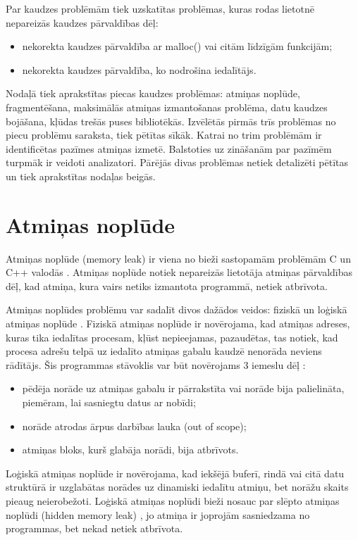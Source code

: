 ﻿ \label{sec:problems}
Par kaudzes problēmām tiek uzskatītas problēmas, kuras rodas lietotnē nepareizās kaudzes pārvaldības dēļ: 
\begin{itemize}
\item nekorekta kaudzes pārvaldība ar malloc() vai citām līdzīgām funkcijām;
\item nekorekta kaudzes pārvaldība, ko nodrošina iedalītājs.
\end{itemize}

Nodaļā tiek aprakstītas piecas kaudzes problēmas: atmiņas noplūde, fragmentēšana, maksimālās atmiņas izmantošanas problēma, datu kaudzes bojāšana, kļūdas trešās puses bibliotēkās.
Izvēlētās pirmās trīs problēmas no piecu problēmu saraksta, tiek pētītas sīkāk. 
Katrai no trim problēmām ir identificētas pazīmes atmiņas izmetē.
Balstoties uz zināšanām par pazīmēm turpmāk ir veidoti analizatori.
Pārējās divas problēmas netiek detalizēti pētītas un tiek aprakstītas nodaļas beigās.

\section{Atmiņas noplūde}

Atmiņas noplūde (memory leak) ir viena no bieži sastopamām problēmām C un C++ valodās \cite{GNED}.
Atmiņas noplūde notiek nepareizās lietotāja atmiņas pārvaldības dēļ, kad atmiņa, kura vairs netiks izmantota programmā, netiek atbrīvota.

Atmiņas noplūdes problēmu var sadalīt divos dažādos veidos: fiziskā un loģiskā atmiņas noplūde \cite{JMMR}.
Fiziskā atmiņas noplūde ir novērojama, kad atmiņas adreses, kuras tika iedalītas procesam,  kļūst nepieejamas, pazaudētas, tas notiek, kad procesa adrešu telpā uz iedalīto atmiņas gabalu kaudzē nenorāda neviens rādītājs.
Šis programmas stāvoklis var būt novērojams 3 iemeslu dēļ \cite{JMMR}:
\begin{itemize}
\item pēdēja norāde uz atmiņas gabalu ir pārrakstīta vai norāde bija palielināta, piemēram, lai sasniegtu datus ar nobīdi;
\item norāde atrodas ārpus darbības lauka (out of scope);
\item atmiņas bloks, kurš glabāja norādi, bija atbrīvots.
\end{itemize}

Loģiskā atmiņas noplūde ir novērojama, kad iekšējā buferī, rindā vai citā datu struktūrā ir uzglabātas norādes uz dinamiski iedalītu atmiņu, bet norāžu skaits pieaug neierobežoti.
Loģiskā atmiņas noplūdi bieži nosauc par slēpto atmiņas noplūdi (hidden memory leak) \cite{RRUU}, jo atmiņa ir joprojām sasniedzama no programmas, bet nekad netiek atbrīvota.


